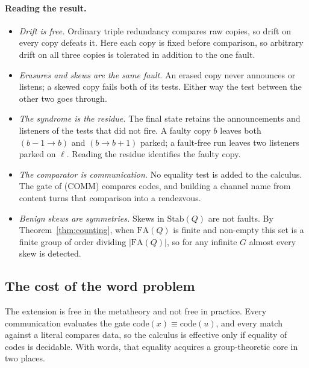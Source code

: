 \documentclass[11pt]{article}
\theoremstyle{definition}
\theoremstyle{remark}
\newcommand{\scong}{\equiv}
\newcommand{\Stab}{\mathrm{Stab}}
\newcommand{\code}{\mathrm{code}}
\newcommand{\FA}{\mathrm{FA}}
\begin{document}
\paragraph{Reading the result.}
\begin{itemize}[leftmargin=1.5em]
\item \emph{Drift is free.} Ordinary triple redundancy compares raw copies,
  so drift on every copy defeats it. Here each copy is fixed before
  comparison, so arbitrary drift on all three copies is tolerated in
  addition to the one fault.
\item \emph{Erasures and skews are the same fault.} An erased copy never
  announces or listens; a skewed copy fails both of its tests. Either way the
  test between the other two goes through.
\item \emph{The syndrome is the residue.} The final state retains the
  announcements and listeners of the tests that did not fire. A faulty copy
  $b$ leaves both $(b-1\to b)$ and $(b\to b+1)$ parked; a fault-free run
  leaves two listeners parked on $\ell$. Reading the residue identifies the
  faulty copy.
\item \emph{The comparator is communication.} No equality test is added to
  the calculus. The gate of (COMM) compares codes, and building a channel
  name from content turns that comparison into a rendezvous.
\item \emph{Benign skews are symmetries.} Skews in $\Stab(Q)$ are not faults.
  By Theorem~\ref{thm:counting}, when $\FA(Q)$ is finite and non-empty this set
  is a finite group of order dividing $|\FA(Q)|$, so for any infinite $G$
  almost every skew is detected.
\end{itemize}

\subsection{The cost of the word problem}\label{sec:wordcost}

The extension is free in the metatheory and not free in practice. Every
communication evaluates the gate $\code(x)\scong\code(u)$, and every match
against a literal compares data, so the calculus is effective only if
equality of codes is decidable. With words, that equality acquires a
group-theoretic core in two places.
\end{document}
